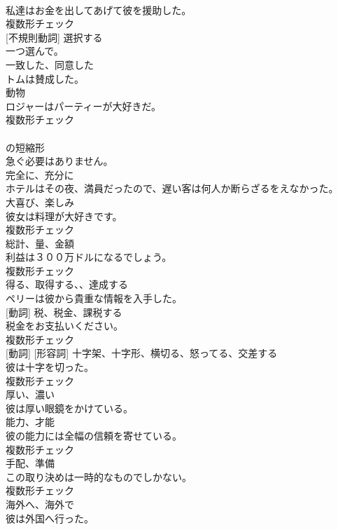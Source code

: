 \documentclass[8pt]{extreport}
\begin{document}
\begin{CJK}{UTF8}{min}
\\	私達はお金を出してあげて彼を援助した。	
\\	複数形チェック
\\	[動詞] [不規則動詞]	選択する	
\\	一つ選んで。	
\\	[形容詞]	一致した、同意した	
\\	トムは賛成した。	
\\	[名詞]	動物	
\\	ロジャーはパーティーが大好きだ。	
\\	複数形チェック
\\	[短縮形]	
\\	の短縮形	
\\	急ぐ必要はありません。	
\\	[副詞]	完全に、充分に	
\\	ホテルはその夜、満員だったので、遅い客は何人か断らざるをえなかった。	
\\	[名詞]	大喜び、楽しみ	
\\	彼女は料理が大好きです。	
\\	複数形チェック
\\	[名詞]	総計、量、金額	
\\	利益は３００万ドルになるでしょう。	
\\	複数形チェック
\\	[動詞]	得る、取得する、、達成する	
\\	ペリーは彼から貴重な情報を入手した。	
\\	[名詞] [動詞]	税、税金、課税する	
\\	税金をお支払いください。	
\\	複数形チェック
\\	[名詞] [動詞] [形容詞]	十字架、十字形、横切る、怒ってる、交差する	
\\	彼は十字を切った。	
\\	複数形チェック
\\	[形容詞]	厚い、濃い	
\\	彼は厚い眼鏡をかけている。	
\\	[名詞]	能力、才能	
\\	彼の能力には全幅の信頼を寄せている。	
\\	複数形チェック
\\	[名詞]	手配、準備	
\\	この取り決めは一時的なものでしかない。	
\\	複数形チェック
\\	[副詞]	海外へ、海外で	
\\	彼は外国へ行った。	

\end{CJK}
\end{document}
